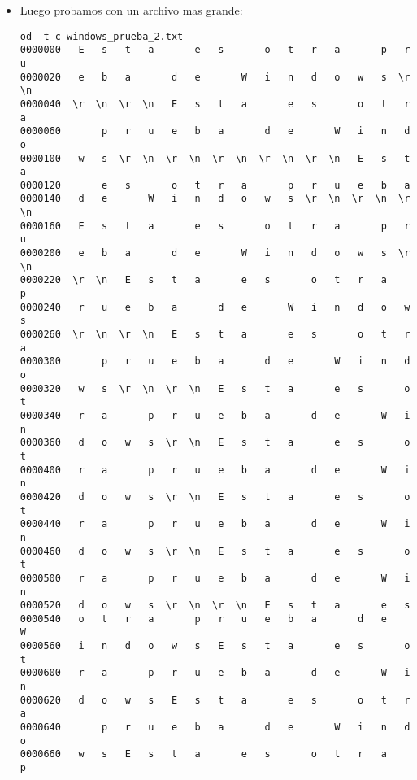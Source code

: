 \documentclass[a4paper,11pt]{article}
\begin{document}
\begin{itemize}
Obteniendo como resultado:
\begin{verbatim}
echo | ./dos2unix -i pruebas/windows_prueba_1.txt | od -t c
0000000   N   i   c   o  \n   E   r   t   g   w   y   g   h   q  \n   q
0000020   e   r   h   y   4   q   3   e   a   u   h   q   4   e   3   r
0000040   u   j   q   4   a      \n   3  \n
0000051
\end{verbatim}

\item Luego probamos con un archivo mas grande:
\begin{verbatim}
od -t c windows_prueba_2.txt 
0000000   E   s   t   a       e   s       o   t   r   a       p   r   u
0000020   e   b   a       d   e       W   i   n   d   o   w   s  \r  \n
0000040  \r  \n  \r  \n   E   s   t   a       e   s       o   t   r   a
0000060       p   r   u   e   b   a       d   e       W   i   n   d   o
0000100   w   s  \r  \n  \r  \n  \r  \n  \r  \n  \r  \n   E   s   t   a
0000120       e   s       o   t   r   a       p   r   u   e   b   a    
0000140   d   e       W   i   n   d   o   w   s  \r  \n  \r  \n  \r  \n
0000160   E   s   t   a       e   s       o   t   r   a       p   r   u
0000200   e   b   a       d   e       W   i   n   d   o   w   s  \r  \n
0000220  \r  \n   E   s   t   a       e   s       o   t   r   a       p
0000240   r   u   e   b   a       d   e       W   i   n   d   o   w   s
0000260  \r  \n  \r  \n   E   s   t   a       e   s       o   t   r   a
0000300       p   r   u   e   b   a       d   e       W   i   n   d   o
0000320   w   s  \r  \n  \r  \n   E   s   t   a       e   s       o   t
0000340   r   a       p   r   u   e   b   a       d   e       W   i   n
0000360   d   o   w   s  \r  \n   E   s   t   a       e   s       o   t
0000400   r   a       p   r   u   e   b   a       d   e       W   i   n
0000420   d   o   w   s  \r  \n   E   s   t   a       e   s       o   t
0000440   r   a       p   r   u   e   b   a       d   e       W   i   n
0000460   d   o   w   s  \r  \n   E   s   t   a       e   s       o   t
0000500   r   a       p   r   u   e   b   a       d   e       W   i   n
0000520   d   o   w   s  \r  \n  \r  \n   E   s   t   a       e   s    
0000540   o   t   r   a       p   r   u   e   b   a       d   e       W
0000560   i   n   d   o   w   s   E   s   t   a       e   s       o   t
0000600   r   a       p   r   u   e   b   a       d   e       W   i   n
0000620   d   o   w   s   E   s   t   a       e   s       o   t   r   a
0000640       p   r   u   e   b   a       d   e       W   i   n   d   o
0000660   w   s   E   s   t   a       e   s       o   t   r   a       p

\end{verbatim}
\end{itemize}
\end{document}
